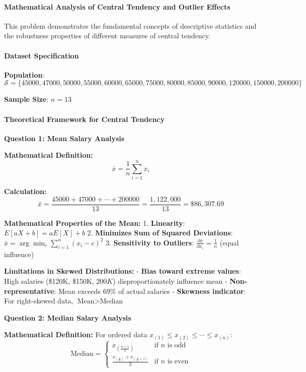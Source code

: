 \documentclass[11pt]{article}
\begin{document}
\paragraph{Mathematical Analysis of Central Tendency and Outlier
Effects}\label{mathematical-analysis-of-central-tendency-and-outlier-effects}

This problem demonstrates the fundamental concepts of descriptive
statistics and the robustness properties of different measures of
central tendency.

\paragraph{Dataset Specification}\label{dataset-specification}

\textbf{Population}:
\(\mathcal{S} = \{45000, 47000, 50000, 55000, 60000, 65000, 75000, 80000, 85000, 90000, 120000, 150000, 200000\}\)

\textbf{Sample Size}: \(n = 13\)

\paragraph{Theoretical Framework for Central
Tendency}\label{theoretical-framework-for-central-tendency}

\textbf{Question 1: Mean Salary Analysis}

\textbf{Mathematical Definition:}
\[\bar{x} = \frac{1}{n}\sum_{i=1}^{n} x_i\]

\textbf{Calculation:}
\[\bar{x} = \frac{45000 + 47000 + \cdots + 200000}{13} = \frac{1,122,000}{13} = \$86,307.69\]

\textbf{Mathematical Properties of the Mean:} 1. \textbf{Linearity}:
\(E[aX + b] = aE[X] + b\) 2. \textbf{Minimizes Sum of Squared
Deviations}: \(\bar{x} = \arg\min_c \sum_{i=1}^{n}(x_i - c)^2\) 3.
\textbf{Sensitivity to Outliers}:
\(\frac{\partial \bar{x}}{\partial x_i} = \frac{1}{n}\) (equal
influence)

\textbf{Limitations in Skewed Distributions:} - \textbf{Bias toward
extreme values}: High salaries (\$120K, \$150K, \(200K\))
disproportionately influence mean - \textbf{Non-representative}: Mean
exceeds 69\% of actual salaries - \textbf{Skewness indicator}: For
right-skewed data, \(\text{Mean} > \text{Median}\)

\textbf{Question 2: Median Salary Analysis}

\textbf{Mathematical Definition:} For ordered data
\(x_{(1)} \leq x_{(2)} \leq \cdots \leq x_{(n)}\):
\[\text{Median} = \begin{cases}
x_{(\frac{n+1}{2})} & \text{if } n \text{ is odd} \\
\frac{x_{(\frac{n}{2})} + x_{(\frac{n}{2}+1)}}{2} & \text{if } n \text{ is even}
\end{cases}\]
\end{document}
